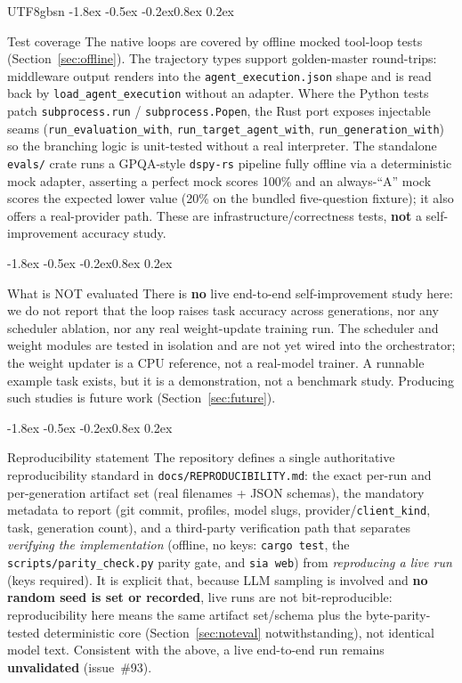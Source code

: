 \documentclass{article}
\makeatletter
\renewcommand{\subsection}{\@startsection{subsection}{2}{\z@}%
  {-1.8ex \@plus -0.5ex \@minus -0.2ex}{0.8ex \@plus 0.2ex}%
  {\normalsize\bfseries\raggedright\color{accent}}}
\makeatother
\begin{document}
\begin{CJK}{UTF8}{gbsn}
\subsection{Test coverage}
The native loops are covered by offline mocked tool-loop tests
(Section~\ref{sec:offline}). The trajectory types support golden-master round-trips:
middleware output renders into the \texttt{agent\_execution.json} shape and is read
back by \texttt{load\_agent\_execution} without an adapter. Where the Python tests
patch \texttt{subprocess.run} / \texttt{subprocess.Popen}, the Rust port exposes
injectable seams (\texttt{run\_evaluation\_with}, \texttt{run\_target\_agent\_with},
\texttt{run\_generation\_with}) so the branching logic is unit-tested without a real
interpreter. The standalone \texttt{evals/} crate runs a GPQA-style \texttt{dspy-rs}
pipeline fully offline via a deterministic mock adapter, asserting a perfect mock
scores 100\% and an always-``A'' mock scores the expected lower value (20\% on the
bundled five-question fixture); it also offers a real-provider path. These are
infrastructure/correctness tests, \textbf{not} a self-improvement accuracy study.

\subsection{What is NOT evaluated}
\label{sec:noteval}
There is \textbf{no} live end-to-end self-improvement study here: we do not report
that the loop raises task accuracy across generations, nor any scheduler ablation,
nor any real weight-update training run. The scheduler and weight modules are tested
in isolation and are not yet wired into the orchestrator; the weight updater is a CPU
reference, not a real-model trainer. A runnable example task exists, but it is a
demonstration, not a benchmark study. Producing such studies is future work
(Section~\ref{sec:future}).

\subsection{Reproducibility statement}
The repository defines a single authoritative reproducibility standard in
\texttt{docs/REPRODUCIBILITY.md}: the exact per-run and per-generation artifact set
(real filenames + JSON schemas), the mandatory metadata to report (git commit,
profiles, model slugs, provider/\texttt{client\_kind}, task, generation count), and a
third-party verification path that separates \emph{verifying the implementation}
(offline, no keys: \texttt{cargo test}, the \texttt{scripts/parity\_check.py} parity
gate, and \texttt{sia web}) from \emph{reproducing a live run} (keys required). It is
explicit that, because LLM sampling is involved and \textbf{no random seed is set or
recorded}, live runs are not bit-reproducible: reproducibility here means the same
artifact set/schema plus the byte-parity-tested deterministic core
(Section~\ref{sec:noteval} notwithstanding), not identical model text. Consistent
with the above, a live end-to-end run remains \textbf{unvalidated} (issue~\#93).


\end{CJK}
\end{document}
